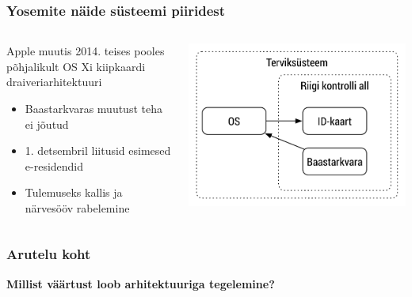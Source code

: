 \begin{frame}[label=Yosemite]
	\frametitle{Yosemite näide süsteemi piiridest}
	\begin{columns}[t]
		\begin{column}{6.5cm}
			Apple muutis 2014. teises pooles põhjalikult OS Xi kiipkaardi draiveriarhitektuuri
			\begin{itemize}
				\item Baastarkvaras muutust teha ei jõutud 
				\item 1. detsembril liitusid esimesed e-residendid
				\item Tulemuseks kallis ja närvesööv rabelemine
			\end{itemize}
		\end{column}
		\begin{column}[T]{4.5cm}
			\includegraphics[width=\textwidth]{yosemite.pdf}
		\end{column}
	\end{columns}
\end{frame}

\begin{frame}[fragile]
  \frametitle{Arutelu koht}
		\begin{center}
			\textbf{Millist väärtust loob arhitektuuriga tegelemine?}
		\end{center}
\end{frame}

